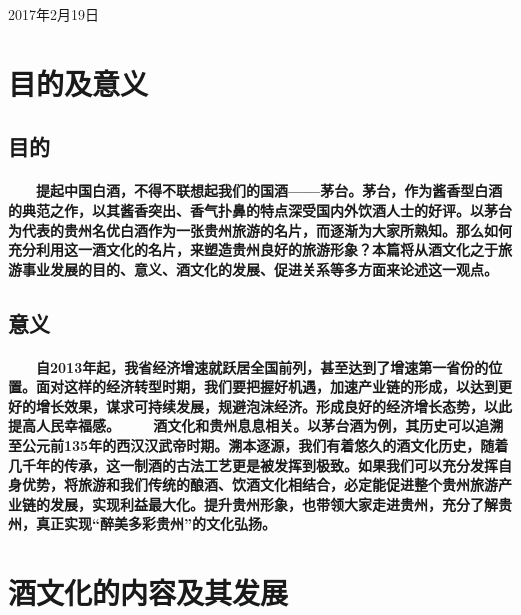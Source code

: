 \documentclass[12pt,a4paper]{ctexart} %
\newcommand{\Date}[3]{\heiti\zihao{2} #1年#2月#3日}    %
\begin{document}
\Date{2017}{2}{19}
\setcounter{page}{0}    %
\thispagestyle{empty}   %
\newpage    %

\textnormal{
\setcounter{tocdepth}{2}    %
\tableofcontents}    %
\setcounter{page}{0}
\thispagestyle{empty}
\newpage

\flushleft
\section{目的及意义}
\subsection{目的}
\paragraph{\textnormal{　　提起中国白酒，不得不联想起我们的国酒——茅台。茅台，作为酱香型白酒的典范之作，以其酱香突出、香气扑鼻的特点深受国内外饮酒人士的好评。以茅台为代表的贵州名优白酒作为一张贵州旅游的名片，而逐渐为大家所熟知。那么如何充分利用这一酒文化的名片，来塑造贵州良好的旅游形象？本篇将从酒文化之于旅游事业发展的目的、意义、酒文化的发展、促进关系等多方面来论述这一观点。}}
\subsection{意义}
\paragraph{\textnormal{　　自2013年起，我省经济增速就跃居全国前列，甚至达到了增速第一省份的位置。面对这样的经济转型时期，我们要把握好机遇，加速产业链的形成，以达到更好的增长效果，谋求可持续发展，规避泡沫经济。形成良好的经济增长态势，以此提高人民幸福感。
\newline 　　酒文化和贵州息息相关。以茅台酒为例，其历史可以追溯至公元前135年的西汉汉武帝时期\cite{history}。溯本逐源，我们有着悠久的酒文化历史，随着几千年的传承，这一制酒的古法工艺更是被发挥到极致。如果我们可以充分发挥自身优势，将旅游和我们传统的酿酒、饮酒文化相结合，必定能促进整个贵州旅游产业链的发展，实现利益最大化。提升贵州形象，也带领大家走进贵州，充分了解贵州，真正实现“醉美多彩贵州”的文化弘扬。}}
\section{酒文化的内容及其发展}
\end{document}
